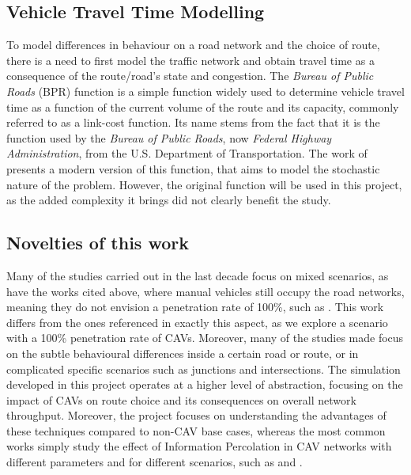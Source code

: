 \subsection{Vehicle Travel Time Modelling}

To model differences in behaviour on a road network and the choice of route, there is a need to first model the traffic network and obtain travel time as a consequence of the route/road's state and congestion. The \textit{Bureau of Public Roads} (BPR) function is a simple function widely used to determine vehicle travel time as a function of the current volume of the route and its capacity, commonly referred to as a link-cost function. Its name stems from the fact that it is the function used by the \textit{Bureau of Public Roads}, now \textit{Federal Highway Administration}, from the U.S. Department of Transportation. The work of \cite{gore2023modified} presents a modern version of this function, that aims to model the stochastic nature of the problem. However, the original function will be used in this project, as the added complexity it brings did not clearly benefit the study.  

\subsection{Novelties of this work}

Many of the studies carried out in the last decade focus on mixed scenarios, as have the works cited above, where manual vehicles still occupy the road networks, meaning they do not envision a penetration rate of 100\%, such as \cite{ye2018impact}. This work differs from the ones referenced in exactly this aspect, as we explore a scenario with a 100\% penetration rate of CAVs. Moreover, many of the studies made focus on the subtle behavioural differences inside a certain road or route, or in complicated specific scenarios such as junctions and intersections. The simulation developed in this project operates at a higher level of abstraction, focusing on the impact of CAVs on route choice and its consequences on overall network throughput. Moreover, the project focuses on understanding the advantages of these techniques compared to non-CAV base cases, whereas the most common works simply study the effect of Information Percolation in CAV networks with different parameters and for different scenarios, such as \cite{talebpour2018effect} and \cite{shang2017agent}.